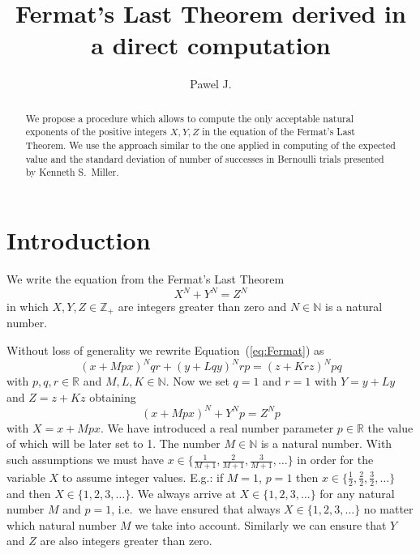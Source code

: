 \documentclass[SecEq,CM,GP]{degruyter-crelle} %
\title[FLT derived in a direct computation]{Fermat's Last Theorem derived in a direct computation}
\author{Pawel J.}{Piskorz}{}{Krakow}
\theoremstyle{plain}
\theoremstyle{definition}
\begin{document}
\begin{abstract}
    We propose a procedure which allows to compute the only acceptable natural
    exponents of the positive integers $X, Y, Z$
    in the equation of the Fermat's Last Theorem. 
    We use the approach similar to the one applied in
    computing of the expected value and the standard deviation of number of successes in Bernoulli 
    trials presented by Kenneth S.~Miller.
\end{abstract}



\section{Introduction}\label{sec:intro}

We write the equation from the Fermat's Last Theorem~\cite{FLT_Wikipedia}
\begin{equation}
\label{eq:Fermat}
X^N + Y^N = Z^N
\end{equation}
in which
$X, Y, Z \in \mathbb{Z_{+}}$ are integers
greater than zero
and $N \in \mathbb{N}$ is a natural number.

Without loss of generality we rewrite Equation~(\ref{eq:Fermat}) as
\begin{equation}
  \label{eq:FermatGeneralEquation}
  (x + Mpx)^{N} qr + (y + Lqy)^{N} rp = (z + Krz)^{N} pq
  \end{equation}
with $p, q, r \in \mathbb{R}$
and $M, L, K \in \mathbb{N}$\@.
Now we set $q=1$ and $r=1$
with $Y = y + Ly$ and $Z = z + Kz$
obtaining
\begin{equation}
\label{eq:FermatEquation}
(x + Mpx)^N + Y^N p = Z^N p
\end{equation}
with $X=x + Mpx$.
We have introduced a real number parameter $p \in \mathbb{R}$ the value of which will 
be later set to 1\@.
The number $M \in \mathbb{N}$ is a natural number.
With such assumptions we must have $x \in \{ \frac{1}{M+1}, \frac{2}{M+1}, \frac{3}{M+1}, \ldots \}$
in order for the variable $X$ to assume integer values.
E.g.: if $M=1$, $p=1$ then $x \in \{ \frac{1}{2}, \frac{2}{2}, \frac{3}{2}, \ldots \}$
and then $X \in \{1, 2, 3, \ldots \}$\@.
We always arrive at $X \in \{1, 2, 3, \ldots \}$ for any natural number $M$ and $p=1$,
i.e.~we have ensured that always $X \in \{1, 2, 3, \ldots \}$ no matter which natural number $M$ we take
into account. Similarly we can ensure that $Y$ and $Z$ are also integers greater than zero.
\end{document}
